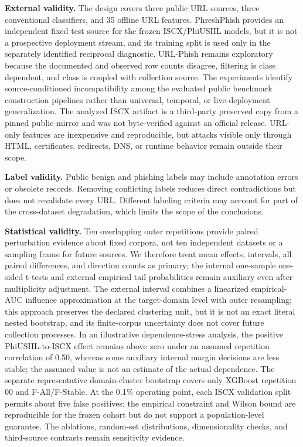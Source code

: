 \documentclass[
  10pt,
]{article}
\begin{document}
\textbf{External validity.} The design covers three public URL sources,
three conventional classifiers, and 35 offline URL features. PhreshPhish
provides an independent fixed test source for the frozen ISCX/PhiUSIIL
models, but it is not a prospective deployment stream, and its training
split is used only in the separately identified reciprocal diagnostic.
URL-Phish remains exploratory because the documented and observed row
counts disagree, filtering is class dependent, and class is coupled with
collection source. The experiments identify source-conditioned
incompatibility among the evaluated public benchmark construction
pipelines rather than universal, temporal, or live-deployment
generalization. The analyzed ISCX artifact is a third-party preserved
copy from a pinned public mirror and was not byte-verified against an
official release. URL-only features are inexpensive and reproducible,
but attacks visible only through HTML, certificates, redirects, DNS, or
runtime behavior remain outside their scope.

\textbf{Label validity.} Public benign and phishing labels may include
annotation errors or obsolete records. Removing conflicting labels
reduces direct contradictions but does not revalidate every URL.
Different labeling criteria may account for part of the cross-dataset
degradation, which limits the scope of the conclusions.

\textbf{Statistical validity.} Ten overlapping outer repetitions provide
paired perturbation evidence about fixed corpora, not ten independent
datasets or a sampling frame for future sources. We therefore treat mean
effects, intervals, all paired differences, and direction counts as
primary; the internal one-sample one-sided t-tests and external
empirical tail probabilities remain auxiliary even after multiplicity
adjustment. The external interval combines a linearized empirical-AUC
influence approximation at the target-domain level with outer
resampling; this approach preserves the declared clustering unit, but it
is not an exact literal nested bootstrap, and its finite-corpus
uncertainty does not cover future collection processes. In an
illustrative dependence-stress analysis, the positive PhiUSIIL-to-ISCX
effect remains above zero under an assumed repetition correlation of
0.50, whereas some auxiliary internal margin decisions are less stable;
the assumed value is not an estimate of the actual dependence. The
separate representative domain-cluster bootstrap covers only XGBoost
repetition 00 and F-All/F-Stable. At the 0.1\% operating point, each
ISCX validation split permits about five false positives; the empirical
constraint and Wilson bound are reproducible for the frozen cohort but
do not support a population-level guarantee. The ablations, random-set
distributions, dimensionality checks, and third-source contrasts remain
sensitivity evidence.
\end{document}
